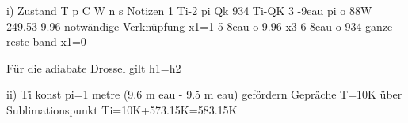 i) Zustand T p C W n s Notizen  
1 Ti-2 pi Qk 934 Ti-QK  
3 -9eau pi o 88W 249.53 9.96 notwändige Verknüpfung x1=1  
5 8eau o 9.96 x3  
6 8eau o 934 ganze reste band x1=0  

Für die adiabate Drossel gilt h1=h2  

ii) Ti konst pi=1 metre (9.6 m eau - 9.5 m eau)  
gefördern Gepräche  
T=10K über Sublimationspunkt Ti=10K+573.15K=583.15K